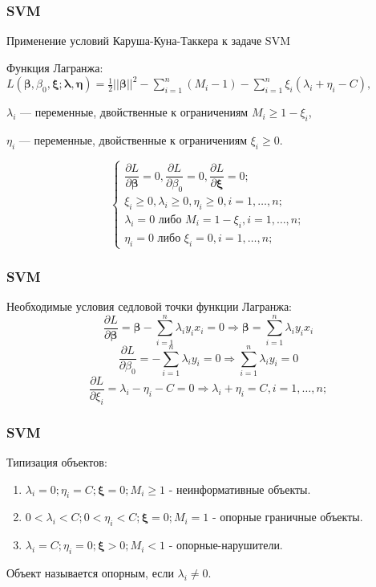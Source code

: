 \documentclass[11pt]{beamer}
\begin{document}
	\begin{frame}
		\frametitle{SVM}
		
		Применение условий Каруша-Куна-Таккера к задаче SVM
		
		Функция Лагранжа: $L(\bm{\beta}, \beta_0, \bm{\xi}; \bm{\lambda}, \bm{\eta}) =  \frac{1}{2} ||\bm{\beta}||^2 - \sum\limits_{i=1}^{n}(M_i - 1) - \sum\limits_{i=1}^{n} \xi_i(\lambda_i + \eta_i - C),$
		
		$\lambda_i$ --- переменные, двойственные к ограничениям $M_i \geqslant 1 - \xi_i$,
		
		$\eta_i$ --- переменные, двойственные к ограничениям $\xi_i \geqslant 0 $.
		
			$$
		\begin{cases}
			\dfrac{\partial L}{\partial \bm{\beta}} = 0, \dfrac{\partial L}{\partial \beta_0} = 0, \dfrac{\partial L}{\partial \bm{\xi}} = 0; \\
			\xi_i \geqslant 0, \lambda_i \geqslant 0, \eta_i \geqslant 0, i = 1, \dotsc, n; \\
			\lambda_i = 0 \text{ либо } M_i = 1 - \xi_i, i = 1, \dotsc, n; \\
			\eta_i = 0 \text{ либо } \xi_i = 0, i = 1, \dotsc, n;
		\end{cases}
		$$
	
	\end{frame}
	\begin{frame}
		\frametitle{SVM}
		Необходимые условия седловой точки функции Лагранжа:
		$$ 	\dfrac{\partial L}{\partial \bm{\beta}} = \bm{\beta} - \sum\limits_{i=1}^{n}\lambda_i y_i x_i = 0 \Longrightarrow \bm{\beta} = \sum\limits_{i=1}^{n}\lambda_i y_i x_i $$
		$$ 	\dfrac{\partial L}{\partial \beta_0} = - \sum\limits_{i=1}^{n}\lambda_i y_i = 0 \Longrightarrow \sum\limits_{i=1}^{n}\lambda_i y_i = 0 $$
		$$ 	\dfrac{\partial L}{\partial \xi_i} = \lambda_i - \eta_i - C = 0 \Longrightarrow \lambda_i + \eta_i = C, i = 1, \dotsc, n; $$
	
	\end{frame}
	
	\begin{frame}
		\frametitle{SVM}
		Типизация объектов:
		\begin{enumerate}
			\item $ \lambda_i = 0; \eta_i = C; \bm{\xi} = 0; M_i \geqslant 1 $ - неинформативные объекты.
			\item $ 0 < \lambda_i < C; 0 < \eta_i < C; \bm{\xi} = 0; M_i = 1 $ - опорные граничные объекты.
			\item $ \lambda_i = C; \eta_i = 0; \bm{\xi} > 0; M_i < 1 $ - опорные-нарушители.
			
		\end{enumerate}
	
	\bigskip
	
	Объект называется опорным, если $\lambda_i \neq 0$.
		
	\end{frame}
\end{document}
